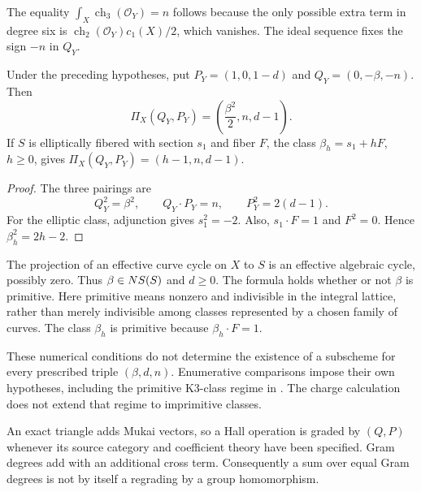 \begin{remark}
\label{rem:threefold-euler-characteristic-no-todd-correction}
The equality $\int_X\operatorname{ch}_3(\mathcal O_Y)=n$ follows
because the only possible extra term in degree six is
$\operatorname{ch}_2(\mathcal O_Y)c_1(X)/2$, which vanishes.
The ideal sequence fixes the sign $-n$ in $Q_Y$.
\end{remark}

\begin{theorem}
\label{thm:d6-d2-d0-dictionary-appendixC}
Under the preceding hypotheses, put
$P_Y=(1,0,1-d)$ and $Q_Y=(0,-\beta,-n)$.  Then
\[
\Pi_X(Q_Y,P_Y)=\left(\frac{\beta^2}{2},n,d-1\right).
\]
If $S$ is elliptically fibered with section $s_1$ and fiber $F$,
the class $\beta_h=s_1+hF$, $h\geq0$, gives
$\Pi_X(Q_Y,P_Y)=(h-1,n,d-1)$.
\end{theorem}

\begin{proof}
The three pairings are
\[
Q_Y^2=\beta^2,\qquad Q_Y\cdot P_Y=n,\qquad P_Y^2=2(d-1).
\]
For the elliptic class, adjunction gives $s_1^2=-2$.  Also,
$s_1\cdot F=1$ and $F^2=0$.  Hence $\beta_h^2=2h-2$.
\end{proof}

\begin{remark}
\label{rem:algebraic-versus-primitive-d2-charges}
The projection of an effective curve cycle on $X$ to $S$ is an
effective algebraic cycle, possibly zero.  Thus
$\beta\in NS(S)$ and $d\geq0$.  The formula holds whether or not
$\beta$ is primitive.  Here primitive means nonzero and indivisible
in the integral lattice, rather than merely indivisible among
classes represented by a chosen family of curves.  The class
$\beta_h$ is primitive because $\beta_h\cdot F=1$.

These numerical conditions do not determine the existence of a
subscheme for every prescribed triple $(\beta,d,n)$.  Enumerative
comparisons impose their own hypotheses, including the primitive
K3-class regime in \cite{OPand}.  The charge calculation does not
extend that regime to imprimitive classes.
\end{remark}

\begin{remark}
\label{rem:chart-data-not-additive-hall-grading}
An exact triangle adds Mukai vectors, so a Hall operation is graded
by $(Q,P)$ whenever its source category and coefficient theory have
been specified.  Gram degrees add with an additional cross term.
Consequently a sum over equal Gram degrees is not by itself a
regrading by a group homomorphism.
\end{remark}

